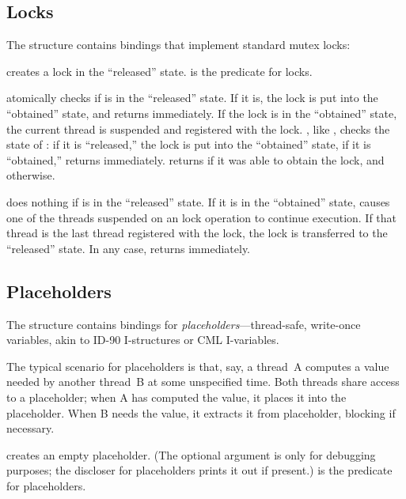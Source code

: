 \subsection{Locks}

The  structure contains bindings that implement standard
mutex locks:
%
\begin{protos}
\end{protos}
%
 creates a lock in the ``released'' state.
 is the predicate for locks.

 atomically checks if  is in the
``released'' state.  If it is, the lock is put into the ``obtained''
state, and  returns immediately.  If the lock is in
the ``obtained'' state, the current thread is suspended and registered
with the lock.
, like , checks the state of
: if it is ``released,'' the lock is put into the
``obtained'' state, if it is ``obtained,'' 
returns immediately.   returns  if
it was able to obtain the lock, and  otherwise.

 does nothing if  is in the ``released''
state.  If it is in the ``obtained'' state, 
causes one of the threads suspended on an  lock
operation to continue execution.  If that thread is the last thread
registered with the lock, the lock is transferred to the ``released''
state.  In any case,  returns immediately.

\subsection{Placeholders}
\label{placeholders}

The  structure contains bindings for
\textit{placeholders}---thread-safe, write-once variables, akin to
ID-90 I-structures or CML I-variables.

The typical scenario for placeholders is that, say, a thread~A
computes a value needed by another thread~B at some unspecified time.
Both threads share access to a placeholder; when A has computed the
value, it places it into the placeholder.  When B needs the value, it
extracts it from placeholder, blocking if necessary.
%
\begin{protos}
\end{protos}
%
 creates an empty placeholder.  (The optional
 argument is only for debugging purposes; the discloser for
placeholders prints it out if present.)   is the
predicate for placeholders.

